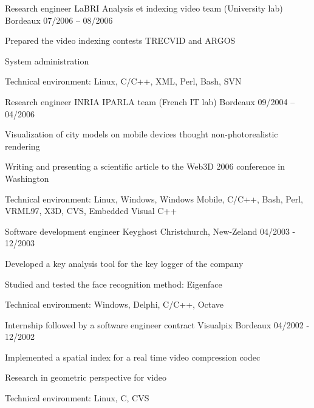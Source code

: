 \begin{cventries}
  \cventry
    {Research engineer}
    {LaBRI Analysis et indexing video team (University lab)}
    {Bordeaux}
    {07/2006 – 08/2006}
    {
      \begin{cvitems}
        \item {Prepared the video indexing contests TRECVID and ARGOS}
        \item {System administration}
        \item {Technical environment: Linux, C/C++, XML, Perl, Bash, SVN}
      \end{cvitems}
    }

  \cventry
    {Research engineer}
    {INRIA IPARLA team (French IT lab)}
    {Bordeaux}
    {09/2004 – 04/2006}
    {
      \begin{cvitems}
        \item {Visualization of city models on mobile devices thought
            non-photorealistic rendering}
        \item {Writing and presenting a scientific article to the Web3D 2006
            conference in Washington}
        \item {Technical environment: Linux, Windows, Windows Mobile, C/C++,
            Bash, Perl, VRML97, X3D, CVS, Embedded Visual C++}
      \end{cvitems}
    }

  \cventry
    {Software development engineer}
    {Keyghost}
    {Christchurch, New-Zeland}
    {04/2003 - 12/2003}
    {
      \begin{cvitems}
        \item {Developed a key analysis tool for the key logger of the company}
        \item {Studied and tested the face recognition method: Eigenface}
		\item {Technical environment: Windows, Delphi, C/C++, Octave}
      \end{cvitems}
    }

  \cventry
    {Internship followed by a software engineer contract}
    {Visualpix}
    {Bordeaux}
    {04/2002 - 12/2002}
    {
      \begin{cvitems}
        \item {Implemented a spatial index for a real time video compression
            codec}
        \item {Research in geometric perspective for video}
		\item {Technical environment: Linux, C, CVS}
      \end{cvitems}
    }


\end{cventries}
